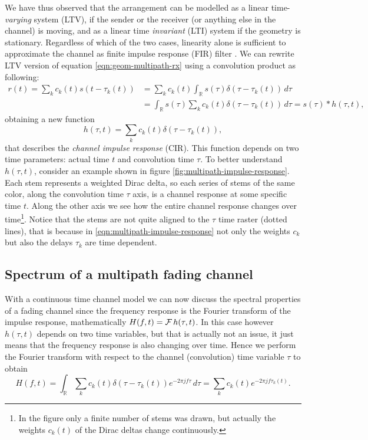 We have thus observed that the arrangement can be modelled as a linear time-\emph{varying} system (LTV), if the sender or the receiver (or anything else in the channel) is moving, and as a linear time \emph{invariant} (LTI) system if the geometry is stationary. Regardless of which of the two cases, linearity alone is sufficient to approximate the channel as finite impulse response (FIR) filter \cite{Messier}. We can rewrite LTV version of equation \eqref{eqn:geom-multipath-rx} using a convolution product as following:
\begin{align*}
	r(t) = \sum_k c_k(t) s(t - \tau_k(t)) &= \sum_k c_k(t) \int_\mathbb{R} s(\tau) \delta(\tau - \tau_k(t)) \,d\tau \\
		&= \int_\mathbb{R} s(\tau) \sum_k c_k(t) \delta(\tau - \tau_k(t)) \,d\tau = s(\tau) * h(\tau, t),
\end{align*}
obtaining a new function
\begin{equation} \label{eqn:multipath-impulse-response}
	h(\tau, t) = \sum_k c_k(t) \delta(\tau - \tau_k(t)),
\end{equation}
that describes the \emph{channel impulse response} (CIR). This function depends on two time parameters: actual time \(t\) and convolution time \(\tau\). To better understand \(h(\tau, t)\), consider an example shown in figure \ref{fig:multipath-impulse-response}. Each stem represents a weighted Dirac delta, so each series of stems of the same color, along the convolution time \(\tau\) axis, is a channel response at some specific time \(t\). Along the other axis we see how the entire channel response changes over time\footnote{In the figure only a finite number of stems was drawn, but actually the weights \(c_k(t)\) of the Dirac deltas change continuously.}. Notice that the stems are not quite aligned to the \(\tau\) time raster (dotted lines), that is because in \eqref{eqn:multipath-impulse-response} not only the weights \(c_k\) but also the delays \(\tau_k\) are time dependent.

\subsection{Spectrum of a multipath fading channel}

With a continuous time channel model we can now discuss the spectral properties of a fading channel since the frequency response is the Fourier transform of the impulse response, mathematically \(H(f, t) = \operatorname{\mathcal{F}} h(\tau, t)\). In this case however \(h(\tau, t)\) depends on two time variables, but that is actually not an issue, it just means that the frequency response is also changing over time. Hence we perform the Fourier transform with respect to the channel (convolution) time variable \(\tau\) to obtain
\begin{equation} \label{eqn:multipath-frequency-response}
	H(f, t) = \int_\mathbb{R} \sum_k c_k(t) \delta(\tau - \tau_k(t)) e^{-2\pi jf\tau} \, d\tau
	= \sum_k c_k(t) e^{-2\pi jf \tau_k(t)}.
\end{equation}

